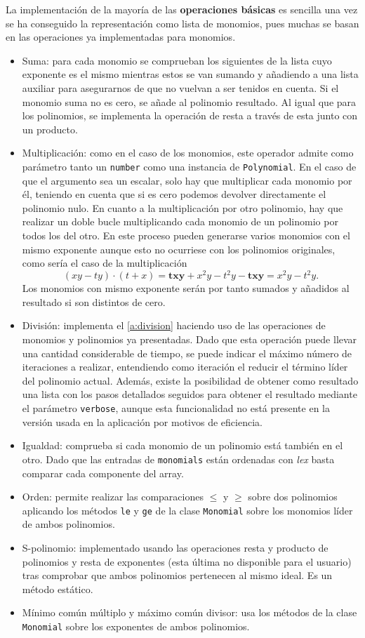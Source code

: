 La implementación de la mayoría de las \textbf{operaciones básicas} es sencilla una vez se ha conseguido la representación como lista de monomios, pues muchas se basan en las operaciones ya implementadas para monomios.
\begin{itemize}
    \item Suma: para cada monomio se comprueban los siguientes de la lista cuyo exponente es el mismo mientras estos se van sumando y añadiendo a una lista auxiliar para asegurarnos de que no vuelvan a ser tenidos en cuenta. Si el monomio suma no es cero, se añade al polinomio resultado. Al igual que para los polinomios, se implementa la operación de resta a través de esta junto con un producto.
    \item Multiplicación: como en el caso de los monomios, este operador admite como parámetro tanto un \texttt{number} como una instancia de \texttt{Polynomial}. En el caso de que el argumento sea un escalar, solo hay que multiplicar cada monomio por él, teniendo en cuenta que si es cero podemos devolver directamente el polinomio nulo. En cuanto a la multiplicación por otro polinomio, hay que realizar un doble bucle multiplicando cada monomio de un polinomio por todos los del otro. En este proceso pueden generarse varios monomios con el mismo exponente aunque esto no ocurriese con los polinomios originales, como sería el caso de la multiplicación
    $$(xy - ty)\cdot(t+x) = \boldsymbol{txy} + x^2y -t^2y - \boldsymbol{txy} = x^2y -t^2y.$$
    Los monomios con mismo exponente serán por tanto sumados y añadidos al resultado si son distintos de cero.
    \item División: implementa el \autoref{a:division} haciendo uso de las operaciones de monomios y polinomios ya presentadas. Dado que esta operación puede llevar una cantidad considerable de tiempo, se puede indicar el máximo número de iteraciones a realizar, entendiendo como iteración el reducir el término líder del polinomio actual. Además, existe la posibilidad de obtener como resultado una lista con los pasos detallados seguidos para obtener el resultado mediante el parámetro \texttt{verbose}, aunque esta funcionalidad no está presente en la versión usada en la aplicación por motivos de eficiencia.
    \item Igualdad: comprueba si cada monomio de un polinomio está también en el otro. Dado que las entradas de \texttt{monomials} están ordenadas con \textit{lex} basta comparar cada componente del array.
    \item Orden: permite realizar las comparaciones $\le$ y $\ge$ sobre dos polinomios aplicando los métodos \texttt{le} y \texttt{ge} de la clase \texttt{Monomial} sobre los monomios líder de ambos polinomios.
    \item S-polinomio: implementado usando las operaciones resta y producto de polinomios y resta de exponentes (esta última no disponible para el usuario) tras comprobar que ambos polinomios pertenecen al mismo ideal. Es un método estático.
    \item Mínimo común múltiplo y máximo común divisor: usa los métodos de la clase \texttt{Monomial} sobre los exponentes de ambos polinomios.
\end{itemize}


